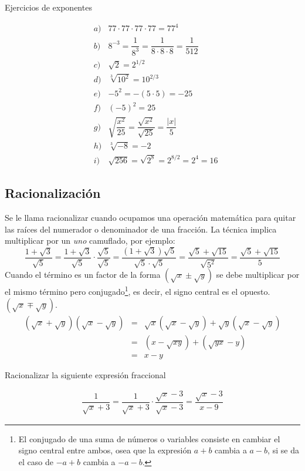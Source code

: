 \begin{myexample}
Ejercicios de exponentes
\end{myexample}
\begin{eqnarray*}
&a)& 77\cdot 77 \cdot 77\cdot 77 =77^{4}\\
&b)& 8^{-3}=\dfrac{1}{8^{3}}=\dfrac{1}{8\cdot 8\cdot 8}=\dfrac{1}{512}\\
&c)& \sqrt{2}=2^{1/2}\\
&d)& \sqrt[3]{10^{2}}=10^{2/3}\\
&e)& -5^{2}=-(5\cdot 5)=-25\\
&f)& (-5)^{2}=25\\
&g)& \sqrt{\dfrac{x^{2}}{25}}=\dfrac{\sqrt{x^{2}}}{\sqrt{25}}=\dfrac{|x|}{5}\\
&h)& \sqrt[3]{-8}=-2\\
&i)& \sqrt{256}=\sqrt{2^{8}}=2^{8/2}=2^{4}=16
\end{eqnarray*}

\subsection{Racionalización}
Se le llama racionalizar cuando ocupamos una operación matemática para quitar las raíces del numerador o denominador de una fracción. La técnica implica multiplicar por un \textit{uno} camuflado, por ejemplo:
\begin{equation*}
\dfrac{1+\sqrt{3}}{\sqrt{5}}=\dfrac{1+\sqrt{3}}{\sqrt{5}}\cdot\dfrac{\sqrt{5}}{\sqrt{5}}=\dfrac{(1+\sqrt{3})\sqrt{5}}{\sqrt{5}\cdot\sqrt{5}}=\dfrac{\sqrt{5}+\sqrt{15}}{\sqrt{5^{2}}}=\dfrac{\sqrt{5}+\sqrt{15}}{5}
\end{equation*}
Cuando el término es un factor de la forma $(\sqrt{x}\pm\sqrt{y})$ se debe multiplicar por el mismo término pero conjugado\footnote{El conjugado de una suma de números o variables consiste en cambiar el signo central entre ambos, osea que la expresión $a+b$ cambia a $a-b$, si se da el caso de $-a+b$ cambia a $-a-b$.}, es decir, el signo central es el opuesto.
$(\sqrt{x}\mp\sqrt{y})$.\\
\begin{eqnarray*}
(\sqrt{x}+\sqrt{y})(\sqrt{x}-\sqrt{y})&=& \sqrt{x}(\sqrt{x}-\sqrt{y})+\sqrt{y}(\sqrt{x}-\sqrt{y})\\
&=& (x-\sqrt{xy})+(\sqrt{yx}-y)\\
&=& x-y
\end{eqnarray*}

\begin{myexample}
Racionalizar la siguiente expresión fraccional
\end{myexample}
\begin{eqnarray*}
\dfrac{1}{\sqrt{x}+3}=\dfrac{1}{\sqrt{x}+3}\cdot \dfrac{\sqrt{x}-3}{\sqrt{x}-3}=\dfrac{\sqrt{x}-3}{x-9}
\end{eqnarray*}

